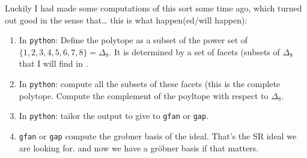 Luckily I had made some computations of this sort some time ago, which turned out good in the sense that… this is what happen(ed/will happen):

\begin{enumerate}
	\item In \texttt{python}: Define the polytope as a subset of the power set of $\{1,2,3,4,5,6,7,8\}=\Delta_8$. It is determined by a set of facets (subsets of $\Delta_8$ that I will find in \cite{grun}.

	\item In \texttt{python}: compute all the subsets of these facets (this is the complete polytope. Compute the complement of the poyltope with respect to  $ \Delta_8$.

	\item In \texttt{python}: tailor the output to give to \texttt{gfan} or \texttt{gap}.

	\item \texttt{gfan} or \texttt{gap} compute the grobner basis of the ideal. That's the SR ideal we are looking for. {\color{1}and now we have a gröbner basis if that matters.}
\end{enumerate}

